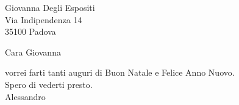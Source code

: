 \documentclass[12pt]{article}
\begin{document}
\hskip10cm
\parbox{5cm}{
  Giovanna  Degli Espositi\\
   Via Indipendenza 14\\
   35100  Padova
  }
\vskip5cm

Cara Giovanna

vorrei farti tanti auguri di Buon Natale e Felice Anno Nuovo.\\
Spero di vederti presto.\\
\vskip1cm
Alessandro
\end{document}

